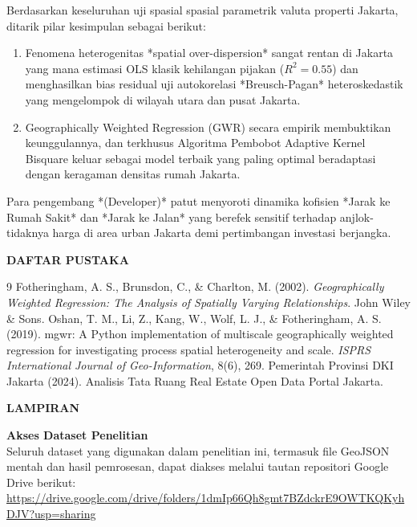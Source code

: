 \documentclass[12pt,a4paper]{article}
\begin{document}
Berdasarkan keseluruhan uji spasial spasial parametrik valuta properti Jakarta, ditarik pilar kesimpulan sebagai berikut:
\begin{enumerate}
    \item Fenomena heterogenitas *spatial over-dispersion* sangat rentan di Jakarta yang mana estimasi OLS klasik kehilangan pijakan ($R^2=0.55$) dan menghasilkan bias residual uji autokorelasi *Breusch-Pagan* heteroskedastik yang mengelompok di wilayah utara dan pusat Jakarta.
    \item Geographically Weighted Regression (GWR) secara empirik membuktikan keunggulannya, dan terkhusus Algoritma Pembobot Adaptive Kernel Bisquare keluar sebagai model terbaik yang paling optimal beradaptasi dengan keragaman densitas rumah Jakarta.
\end{enumerate}
Para pengembang *(Developer)* patut menyoroti dinamika kofisien *Jarak ke Rumah Sakit* dan *Jarak ke Jalan* yang berefek sensitif terhadap anjlok-tidaknya harga di area urban Jakarta demi pertimbangan investasi berjangka.

\newpage
\begin{center}
    {\Large \textbf{DAFTAR PUSTAKA}}
\end{center}
\vspace{10pt}

\begingroup
\renewcommand{\section}[2]{} %
\begin{thebibliography}{9}
Fotheringham, A. S., Brunsdon, C., \& Charlton, M. (2002). \textit{Geographically Weighted Regression: The Analysis of Spatially Varying Relationships}. John Wiley \& Sons.
Oshan, T. M., Li, Z., Kang, W., Wolf, L. J., \& Fotheringham, A. S. (2019). mgwr: A Python implementation of multiscale geographically weighted regression for investigating process spatial heterogeneity and scale. \textit{ISPRS International Journal of Geo-Information}, 8(6), 269.
Pemerintah Provinsi DKI Jakarta (2024). Analisis Tata Ruang Real Estate Open Data Portal Jakarta.
\end{thebibliography}
\endgroup

\newpage
\begin{center}
    {\Large \textbf{LAMPIRAN}}
\end{center}
\vspace{10pt}

\noindent \textbf{Akses Dataset Penelitian} \\
Seluruh dataset yang digunakan dalam penelitian ini, termasuk file GeoJSON mentah dan hasil pemrosesan, dapat diakses melalui tautan repositori Google Drive berikut: \\
\url{https://drive.google.com/drive/folders/1dmIp66Qh8gmt7BZdckrE9OWTKQKyhDJV?usp=sharing}
\end{document}
